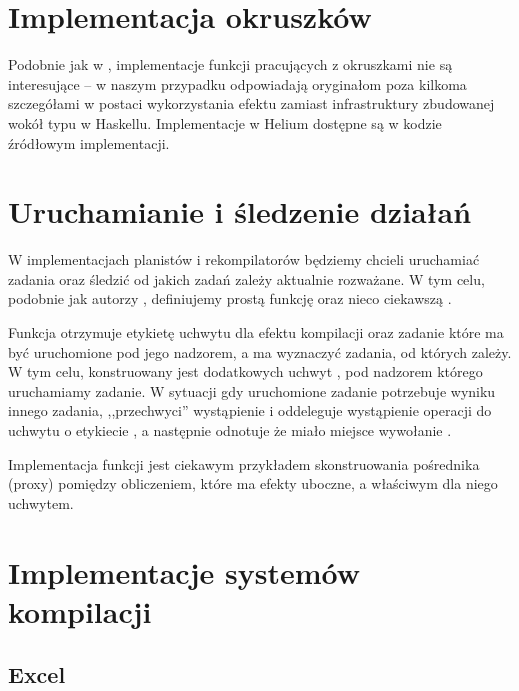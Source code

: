 \section{Implementacja okruszków}

Podobnie jak w \BSaLC{}, implementacje funkcji pracujących z okruszkami nie są interesujące -- w naszym przypadku odpowiadają oryginałom poza kilkoma szczegółami w postaci wykorzystania efektu  zamiast infrastruktury zbudowanej wokół typu  w Haskellu. Implementacje w Helium dostępne są w kodzie źródłowym implementacji.%

\section{Uruchamianie i śledzenie działań}

W implementacjach planistów i rekompilatorów będziemy chcieli uruchamiać zadania oraz śledzić od jakich zadań zależy aktualnie rozważane. W tym celu, podobnie jak autorzy \BSaLC{}, definiujemy prostą funkcję  oraz nieco ciekawszą .



Funkcja  otrzymuje etykietę  uchwytu dla efektu kompilacji oraz zadanie  które ma być uruchomione pod jego nadzorem, a  ma wyznaczyć zadania, od których  zależy. W tym celu, konstruowany jest dodatkowych uchwyt , pod nadzorem którego uruchamiamy zadanie. W sytuacji gdy uruchomione zadanie potrzebuje wyniku innego zadania,  ,,przechwyci'' wystąpienie  i oddeleguje wystąpienie operacji do uchwytu o etykiecie , a następnie odnotuje że miało miejsce wywołanie .

Implementacja funkcji  jest ciekawym przykładem skonstruowania pośrednika (proxy) pomiędzy obliczeniem, które ma efekty uboczne, a właściwym dla niego uchwytem.

\pagebreak

\section{Implementacje systemów kompilacji}

\subsection{Excel}

